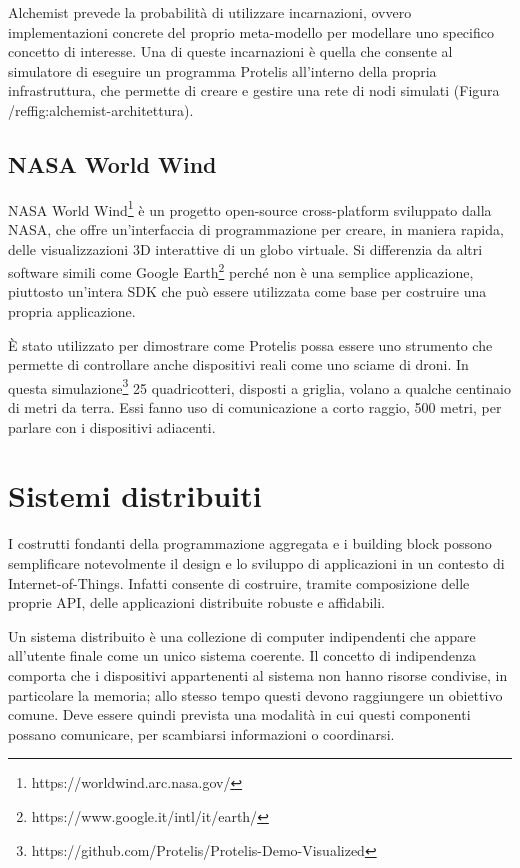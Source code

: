 Alchemist prevede la probabilità di utilizzare incarnazioni, ovvero
implementazioni concrete del proprio meta-modello per modellare uno specifico
concetto di interesse. Una di queste incarnazioni è quella che consente al
simulatore di eseguire un programma Protelis all'interno della propria
infrastruttura, che permette di creare e gestire una rete di nodi simulati
(Figura /ref{fig:alchemist-architettura}).

\subsection{NASA World Wind}
NASA World Wind\footnote{https://worldwind.arc.nasa.gov/} è un progetto
open-source cross-platform sviluppato dalla NASA, che offre un'interfaccia di
programmazione per creare, in maniera rapida, delle visualizzazioni 3D
interattive di un globo virtuale. Si differenzia da altri software simili come
Google Earth\footnote{https://www.google.it/intl/it/earth/} perché non è una
semplice applicazione, piuttosto un'intera SDK che può essere utilizzata come
base per costruire una propria applicazione.

È stato utilizzato per dimostrare come Protelis possa essere uno strumento che
permette di controllare anche dispositivi reali come uno sciame di droni. In
questa
simulazione\footnote{https://github.com/Protelis/Protelis-Demo-Visualized} 25
quadricotteri, disposti a griglia, volano a qualche centinaio di metri da
terra. Essi fanno uso di comunicazione a corto raggio, 500 metri, per parlare
con i dispositivi adiacenti.

\section{Sistemi distribuiti}
I costrutti fondanti della programmazione aggregata e i building block possono
semplificare notevolmente il design e lo sviluppo di applicazioni in un contesto
di Internet-of-Things\cite{DBLP:journals/computer/BealPV15}. Infatti consente di
costruire, tramite composizione delle proprie API, delle applicazioni
distribuite robuste e affidabili.

Un sistema distribuito è una collezione di computer indipendenti che appare
all'utente finale come un unico sistema coerente\cite{tanenbaum2016}.  Il
concetto di indipendenza comporta che i dispositivi appartenenti al sistema non
hanno risorse condivise, in particolare la memoria; allo stesso tempo questi
devono raggiungere un obiettivo comune. Deve essere quindi prevista una modalità
in cui questi componenti possano comunicare, per scambiarsi informazioni o
coordinarsi.

